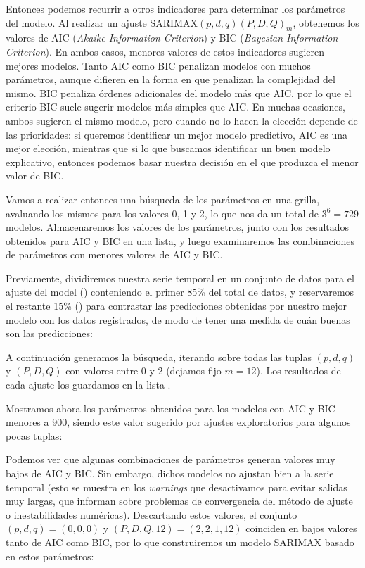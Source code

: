 Entonces podemos recurrir a otros indicadores para determinar los parámetros del modelo. Al realizar un ajuste SARIMAX$(p, d, q)(P, D, Q)_m$, obtenemos los valores de AIC (\textit{Akaike Information Criterion}) y BIC (\textit{Bayesian Information Criterion}). En ambos casos, menores valores de estos indicadores sugieren mejores modelos. Tanto AIC como BIC penalizan modelos con muchos parámetros, aunque difieren en la forma en que penalizan la complejidad del mismo. BIC penaliza órdenes adicionales del modelo más que AIC, por lo que el criterio BIC suele sugerir modelos más simples que AIC. En muchas ocasiones, ambos sugieren el mismo modelo, pero cuando no lo hacen la elección depende de las prioridades: si queremos identificar un mejor modelo predictivo, AIC es una mejor elección, mientras que si lo que buscamos identificar un buen modelo explicativo, entonces podemos basar nuestra decisión en el que produzca el menor valor de BIC.

Vamos a realizar entonces una búsqueda de los parámetros en una grilla, avaluando los mismos para los valores 0, 1 y 2, lo que nos da un total de $3^6 = 729$ modelos. Almacenaremos los valores de los parámetros, junto con los resultados obtenidos para AIC y BIC en una lista, y luego examinaremos las combinaciones de parámetros con menores valores de AIC y BIC.

Previamente, dividiremos nuestra serie temporal en un conjunto de datos para el ajuste del model () conteniendo el primer 85\% del total de datos, y reservaremos el restante 15\% () para contrastar las predicciones obtenidas por nuestro mejor modelo con los datos registrados, de modo de tener una medida de cuán buenas son las predicciones:

A continuación generamos la búsqueda, iterando sobre todas las tuplas $(p, d, q)$ y $(P, D, Q)$ con valores entre 0 y 2 (dejamos fijo $m = 12$). Los resultados de cada ajuste los guardamos en la lista .

Mostramos ahora los parámetros obtenidos para los modelos con AIC y BIC menores a 900, siendo este valor sugerido por ajustes exploratorios para algunos pocas tuplas:


Podemos ver que algunas combinaciones de parámetros generan valores muy bajos de AIC y BIC. Sin embargo, dichos modelos no ajustan bien a la serie temporal (esto se muestra en los \textit{warnings} que desactivamos para evitar salidas muy largas, que informan sobre problemas de convergencia del método de ajuste o inestabilidades numéricas). Descartando estos valores, el conjunto $(p, d, q) = (0, 0, 0)$ y $(P, D, Q, 12) = (2, 2, 1, 12)$ coinciden en bajos valores tanto de AIC como BIC, por lo que construiremos un modelo SARIMAX basado en estos parámetros:

